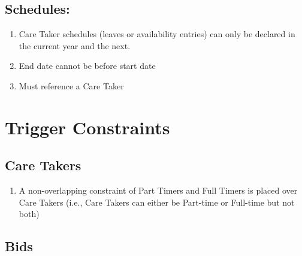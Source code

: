 \documentclass[
  paper=a4,
  ,captions=tableheading
]{scrartcl}
\providecommand{\tightlist}{%
  \setlength{\itemsep}{0pt}\setlength{\parskip}{0pt}}
\begin{document}
\hypertarget{schedules}{%
\subsection{Schedules:}\label{schedules}}

\begin{enumerate}
\def\labelenumi{\arabic{enumi}.}
\tightlist
\item
  Care Taker schedules (leaves or availability entries) can only be
  declared in the current year and the next.
\item
  End date cannot be before start date
\item
  Must reference a Care Taker
\end{enumerate}

\hypertarget{trigger-constraints}{%
\section{Trigger Constraints}\label{trigger-constraints}}

\hypertarget{care-takers-1}{%
\subsection{Care Takers}\label{care-takers-1}}

\begin{enumerate}
\def\labelenumi{\arabic{enumi}.}
\tightlist
\item
  A non-overlapping constraint of Part Timers and Full Timers is placed
  over Care Takers (i.e., Care Takers can either be Part-time or
  Full-time but not both)
\end{enumerate}

\hypertarget{bids-1}{%
\subsection{Bids}\label{bids-1}}
\end{document}
